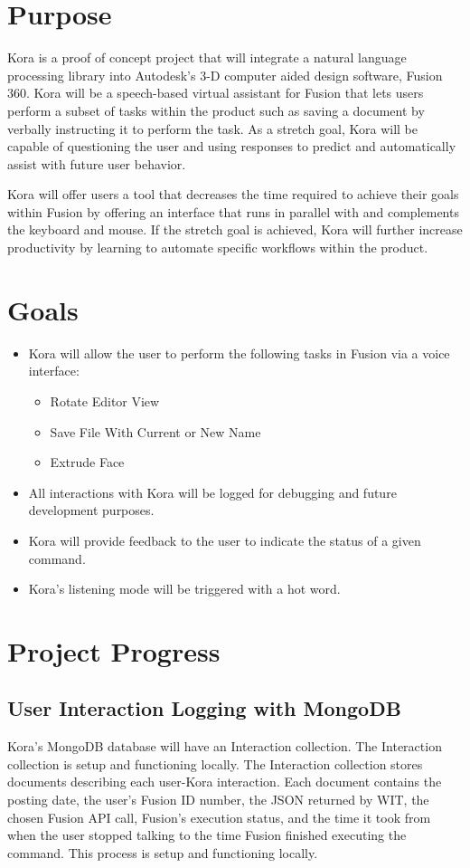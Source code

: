 \documentclass[onecolumn, draftclsnofoot,10pt, compsoc]{IEEEtran}
\begin{document}

\section{Purpose}
	Kora is a proof of concept project that will integrate a natural language processing library into Autodesk's 3-D computer aided design software, Fusion 360.
	Kora will be a speech-based virtual assistant for Fusion that lets users perform a subset of tasks within the product such as saving a document by verbally instructing it to perform the task.
	As a stretch goal, Kora will be capable of questioning the user and using responses to predict and automatically assist with future user behavior.
	
	Kora will offer users a tool that decreases the time required to achieve their goals within Fusion by offering an interface that runs in parallel with and complements the keyboard and mouse.
	If the stretch goal is achieved, Kora will further increase productivity by learning to automate specific workflows within the product.

\section{Goals}
	\begin{itemize}
		\item
			Kora will allow the user to perform the following tasks in Fusion via a voice interface:
			\begin{itemize}
				\item Rotate Editor View
				\item Save File With Current or New Name
				\item Extrude Face
			\end{itemize}
		\item
			All interactions with Kora will be logged for debugging and future development purposes.
		\item
			Kora will provide feedback to the user to indicate the status of a given command.
		\item
			Kora's listening mode will be triggered with a hot word.
	\end{itemize}

\section{Project Progress}
	\subsection{User Interaction Logging with MongoDB}
		Kora's MongoDB database will have an Interaction collection.
		The Interaction collection is setup and functioning locally.
		The Interaction collection stores documents describing each user-Kora interaction.
		Each document contains the posting date, the user's Fusion ID number, the JSON returned by WIT, the chosen Fusion API call, Fusion's execution status, and the time it took from when the user stopped talking to the time Fusion finished executing the command.
		This process is setup and functioning locally.
\end{document}
